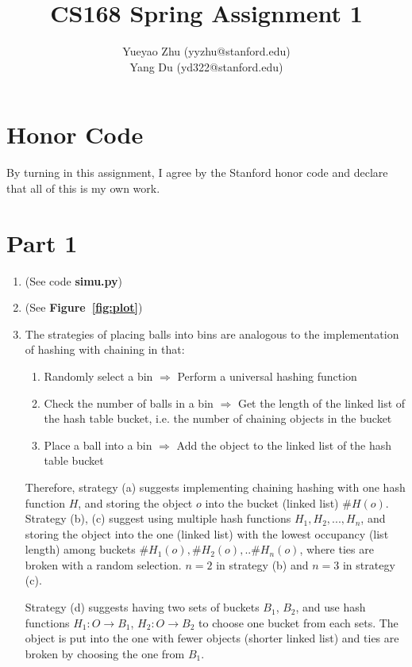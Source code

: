 \documentclass[12pt]{article}
\title{CS168 Spring Assignment 1}
\author{
	Yueyao Zhu	(yyzhu@stanford.edu) \\
	Yang Du (yd322@stanford.edu)
}
\begin{document}
\maketitle

\section*{Honor Code}

By turning in this assignment, I agree by the Stanford honor code and declare
that all of this is my own work.

\section*{Part 1}

\begin{enumerate}[label=(\alph*)]
 	\item (See code \textbf{simu.py})
 	\item (See \textbf{Figure~\ref{fig:plot}})
	\item 

The strategies of placing balls into bins are analogous to the implementation of hashing with chaining in that:
\begin{enumerate}
	\item Randomly select a bin $\Rightarrow{}$ Perform a universal hashing function
	\item Check the number of balls in a bin $\Rightarrow{}$ Get the length of the linked list of the hash table bucket, i.e. the number of chaining objects in the bucket
	\item Place a ball into a bin $\Rightarrow{}$ Add the object to the linked list of the hash table bucket
\end{enumerate}

Therefore, strategy (a) suggests implementing chaining hashing with one hash function $H$, and storing the object $o$ into the bucket (linked list) $\#H(o)$. Strategy (b), (c) suggest using multiple hash functions $H_1, H_2, ..., H_n$, and storing the object into the one (linked list) with the lowest occupancy (list length) among buckets $\#H_1(o), \#H_2(o), .. \#H_n(o)$, where ties are broken with a random selection. $n=2$ in strategy (b) and $n=3$ in strategy (c).

Strategy (d) suggests having two sets of buckets $B_1$, $B_2$, and use hash functions $H_1:O\rightarrow{}B_1$, $H_2:O\rightarrow{}B_2$ to choose one bucket from each sets. The object is put into the one with fewer objects (shorter linked list) and ties are broken by choosing the one from $B_1$.


\end{enumerate}
\end{document}
